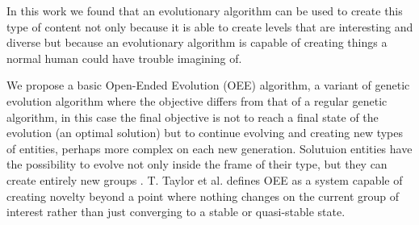\documentclass[conference]{IEEEtran}
\begin{document}
In this work we found that an evolutionary algorithm can be used to create 
this type of content not only because it is able to create levels that are interesting 
and diverse but because an evolutionary algorithm is capable of creating things a 
normal human could have trouble imagining of.





We propose a basic Open-Ended Evolution (OEE) algorithm, a variant of genetic evolution algorithm where
the objective differs from that of a regular genetic algorithm,  in this case the
final objective is not to reach a final state of the evolution (an optimal solution) but to continue
evolving and creating new types of entities, perhaps more complex on each new generation.
Solutuion entities have the possibility to evolve not only inside the frame of
their type, but  they can create entirely new groups \cite{Standish2003}. T. Taylor et al. \cite{Taylor2016,Taylor}
defines OEE as a system capable of creating novelty beyond a point where
nothing changes on the current group of interest rather than just converging to
a stable or quasi-stable state.
\end{document}
